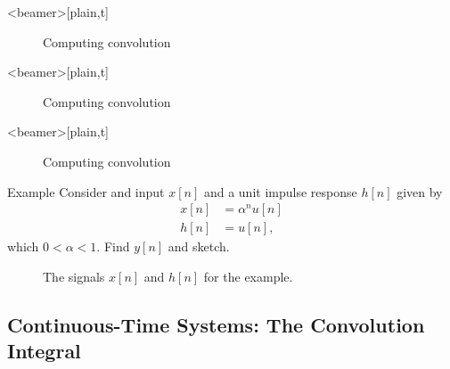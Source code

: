 \begin{frame}<beamer>[plain,t]
    {
    \begin{figure}
      \centering
      
      \caption{Computing convolution}\label{fi:example01_discrete_conv_01}
    \end{figure}
    }
\end{frame}

\begin{frame}<beamer>[plain,t]
    {
    \begin{figure}
      \centering
      
      \caption{Computing convolution}\label{fi:example01_discrete_conv_02}
    \end{figure}
    }
\end{frame}



\begin{frame}<beamer>[plain,t]
    {
    \begin{figure}
      \centering
      
      \caption{Computing convolution}\label{fi:example01_discrete_conv_03}
    \end{figure}
    }
\end{frame}




\begin{frame}{Example}
    Consider and input $x[n]$ and a unit impulse response $h[n]$ given by
    \begin{equation}
        \begin{split}
            x[n] &= \alpha^nu[n]\\
            h[n] &= u[n],
        \end{split}
    \end{equation}
    which $0 < \alpha < 1$. Find $y[n]$ and sketch.
\end{frame}

\begin{frame}[plain]
    {
    \begin{figure}
      \centering
      \caption{The signals $x[n]$ and $h[n]$ for the example.}\label{fi:dt_conv_example23}
    \end{figure}
    }
\end{frame}





\subsection{Continuous-Time Systems: The Convolution Integral}

